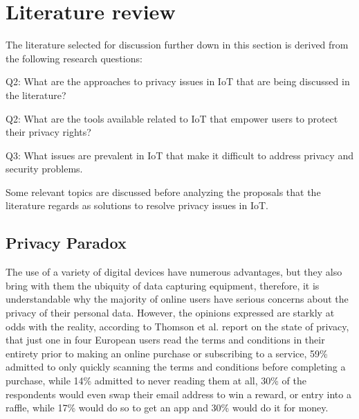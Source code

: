 \documentclass[conference]{IEEEtran}
\begin{document}
\section{Literature review}

The literature selected for discussion further down in this section is derived
from the following research questions:

Q2: What are the approaches to privacy issues in IoT that are
being discussed in the literature?

Q2: What are the tools available related to IoT that empower users to protect
their privacy rights?

Q3: What issues are prevalent in IoT that make it difficult to address privacy
and security problems.

Some relevant topics are discussed before analyzing the proposals that the literature
regards as solutions to resolve privacy issues in IoT.

\subsection{Privacy Paradox}

The use of a variety of digital devices have numerous advantages, but they also
bring with them the ubiquity of data capturing equipment, therefore, it is
understandable why the majority of online users have serious concerns about
the privacy of their personal data. However, the opinions expressed are starkly
at odds with the reality, according to Thomson et al. \cite{DarrenState} report
on the state of privacy, that just one in four European users read the terms
and conditions in their entirety prior to making an online purchase or subscribing
to a service, 59\% admitted to only quickly scanning the terms and conditions before
completing a purchase, while 14\% admitted to never reading them at all, 30\% of
the respondents would even swap their email address to win a reward, or entry
into a raffle, while 17\% would do so to get an app and 30\% would do it for money.
\end{document}
